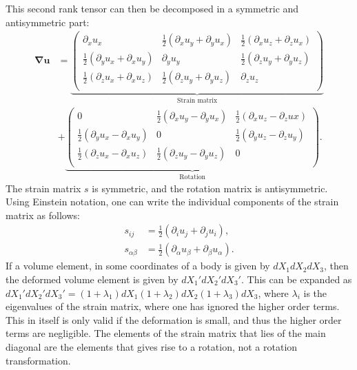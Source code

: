 \documentclass[a4paper]{article}
\newcommand{\grad}{\mathbf{\nabla}}
\begin{document}
This second rank tensor can then be decomposed in a symmetric and antisymmetric part:
\begin{align*}
    \grad{\mathbf{u}} &= \underbrace{\begin{pmatrix}
        \partial_x u_x &\frac{1}{2}\left(\partial_x u_y + \partial_y u_x\right) &\frac{1}{2}\left(\partial_xu_z + \partial_zu_x\right)\\
        \frac{1}{2}\left(\partial_y u_x + \partial_x u_y\right) & \partial_y u_y & \frac{1}{2}\left(\partial_zu_y + \partial_yu_z\right)\\
        \frac{1}{2}\left(\partial_zu_x + \partial_x u_z\right) & \frac{1}{2}\left(\partial_zu_y + \partial_yu_z\right) & \partial_z u_z\\        
    \end{pmatrix}}_{\text{Strain matrix}} \\
    &+ \underbrace{\begin{pmatrix}
        0 & \frac{1}{2}\left(\partial_xu_y - \partial_yu_x\right) & \frac{1}{2}\left(\partial_xu_z - \partial_zux\right)\\
        \frac{1}{2}\left(\partial_yu_x - \partial_xu_y\right) & 0 & \frac{1}{2}\left(\partial_yu_z - \partial_zu_y\right)\\
        \frac{1}{2}\left(\partial_zu_x - \partial_xu_z\right) & \frac{1}{2}\left(\partial_zu_y - \partial_yu_z\right) & 0\\
    \end{pmatrix}}_{\text{Rotation}}.
\end{align*}The strain matrix $s$ is symmetric, and the rotation matrix is antisymmetric. Using Einstein notation, one can write the individual components of the strain matrix as follows:
\begin{align*}
    s_{ij} &= \frac{1}{2}\left(\partial_i u_j + \partial_j u_i\right),\\
    s_{\alpha\beta} &= \frac{1}{2}\left(\partial_\alpha u_\beta + \partial_\beta u_\alpha\right).
\end{align*}If a volume element, in some coordinates of a body is given by $dX_1dX_2dX_3$, then the deformed volume element is given by $dX_1'dX_2'dX_3'$.
This can be expanded as $dX_1'dX_2'dX_3' = (1 + \lambda_1)dX_1(1 + \lambda_2)dX_2(1 + \lambda_3)dX_3$, where $\lambda_i$ is the eigenvalues of the strain matrix, where one has ignored the higher order terms.
This in itself is only valid if the deformation is small, and thus the higher order terms are negligible. The elements of the strain matrix that lies of the main diagonal are the elements that gives rise to a rotation, not a rotation transformation.
\end{document}
